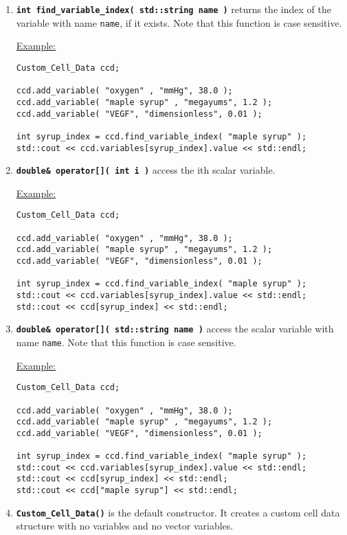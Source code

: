 \documentclass[12pt]{article}
\renewcommand{\v}{\verb}
\newcommand{\smallcode}[1]{\textbf{\texttt{#1}}}
\begin{document}
\begin{enumerate}
\item 
\smallcode{int find\_variable\_index( std::string name )} returns the index of the 
variable with name \v|name|, if it exists. Note that this function is case sensitive. 

\underline{Example:} 
\begin{verbatim}
Custom_Cell_Data ccd; 

ccd.add_variable( "oxygen" , "mmHg", 38.0 ); 
ccd.add_variable( "maple syrup" , "megayums", 1.2 ); 
ccd.add_variable( "VEGF", "dimensionless", 0.01 ); 

int syrup_index = ccd.find_variable_index( "maple syrup" ); 
std::cout << ccd.variables[syrup_index].value << std::endl; 
\end{verbatim}
 	
\item 
\smallcode{double\& operator[]( int i )} access the ith scalar variable. 

\underline{Example:} 
\begin{verbatim}
Custom_Cell_Data ccd; 

ccd.add_variable( "oxygen" , "mmHg", 38.0 ); 
ccd.add_variable( "maple syrup" , "megayums", 1.2 ); 
ccd.add_variable( "VEGF", "dimensionless", 0.01 ); 

int syrup_index = ccd.find_variable_index( "maple syrup" ); 
std::cout << ccd.variables[syrup_index].value << std::endl; 
std::cout << ccd[syrup_index] << std::endl; 
\end{verbatim}

\item 
\smallcode{double\& operator[]( std::string name )}  access the scalar 
variable with name \v|name|. Note that this function is case sensitive. 

\underline{Example:} 
\begin{verbatim}
Custom_Cell_Data ccd; 

ccd.add_variable( "oxygen" , "mmHg", 38.0 ); 
ccd.add_variable( "maple syrup" , "megayums", 1.2 ); 
ccd.add_variable( "VEGF", "dimensionless", 0.01 ); 

int syrup_index = ccd.find_variable_index( "maple syrup" ); 
std::cout << ccd.variables[syrup_index].value << std::endl; 
std::cout << ccd[syrup_index] << std::endl; 
std::cout << ccd["maple syrup"] << std::endl; 
\end{verbatim}

\item 
\smallcode{Custom\_Cell\_Data()} is the default constructor. It creates 
a custom cell data structure with no variables and no vector variables. 
 

\end{enumerate}
\end{document}
